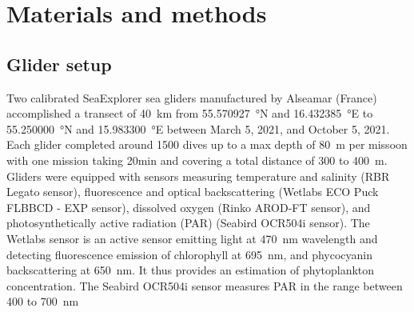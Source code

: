 \documentclass[../Main.tex]{subfiles}
\begin{document}
\section*{\crule[blue]{.3cm}{.3cm} Materials and methods}
\subsection*{\crule[blue]{.2cm}{.2cm} Glider setup}
Two calibrated SeaExplorer sea gliders manufactured by Alseamar (France) accomplished a transect of \SI{40}{km} from \SI{55.570927}{\degree}N and \SI{16.432385}{\degree}E to \SI{55.250000}{\degree}N and \SI{15.983300}{\degree}E between March 5, 2021, and October 5, 2021. 
Each glider completed around 1500 dives up to a max depth of \SI{80}{m} per missoon with one mission taking 20min and covering a total distance of 300 to \SI{400}{m}.  
\\ 
Gliders were equipped with sensors measuring temperature and salinity (RBR Legato sensor), fluorescence and optical backscattering (Wetlabs ECO Puck FLBBCD - EXP sensor), dissolved oxygen (Rinko AROD-FT sensor), and photosynthetically active radiation (PAR) (Seabird OCR504i sensor). 
The Wetlabs sensor is an active sensor emitting light at \SI{470}{nm} wavelength and detecting fluorescence emission of chlorophyll at \SI{695}{nm}, and phycocyanin backscattering at \SI{650}{nm}. 
It thus provides an estimation of phytoplankton concentration. 
The Seabird OCR504i sensor measures PAR in the range between 400 to \SI{700}{nm}%
\end{document}
